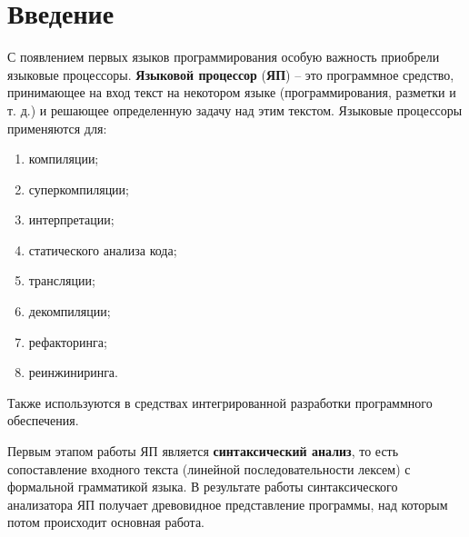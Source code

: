 \section*{Введение}


С появлением первых языков программирования особую важность приобрели языковые процессоры. \textbf{Языковой процессор} (\textbf{ЯП}) -- это программное средство, принимающее на вход текст на некотором языке (программирования, разметки и т. д.) и решающее определенную задачу над этим текстом. Языковые процессоры применяются для:
\begin{enumerate}
\item компиляции;
\item суперкомпиляции;
\item интерпретации;
\item статического анализа кода;
\item трансляции;
\item декомпиляции;
\item рефакторинга;
\item реинжиниринга.
\end{enumerate}
Также используются в средствах интегрированной разработки программного обеспечения. %


Первым этапом работы ЯП является \textbf{синтаксический анализ}, то есть сопоставление входного текста (линейной последовательности лексем) с формальной грамматикой языка. В результате работы синтаксического анализатора ЯП получает древовидное представление программы, над которым потом происходит основная работа.

